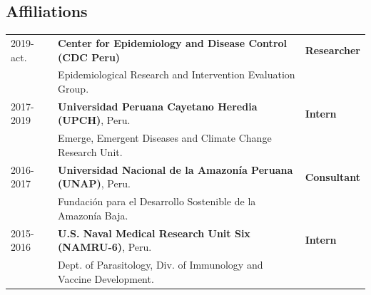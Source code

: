 \documentclass[margin,line]{res}
\begin{document}
\begin{resume}
\section{\sc Affiliations}

\begin{tabular}{ l l l }
	2019- act. & \textbf{Center for Epidemiology and Disease Control (CDC Peru)}&{\bf Researcher}\\
	& Epidemiological Research and Intervention Evaluation Group.&\\
	2017-2019 & \textbf{Universidad Peruana Cayetano Heredia (UPCH)}, Peru.&{\bf Intern}\\
	& Emerge, Emergent Diseases and Climate Change Research Unit.&\\
	2016-2017 & \textbf{Universidad Nacional de la Amazon\'ia Peruana (UNAP)}, Peru.&{\bf Consultant}\\
	& Fundaci\'on para el Desarrollo Sostenible de la Amazon\'ia Baja.&\\
	2015-2016 & \textbf{U.S. Naval Medical Research Unit Six (NAMRU-6)}, Peru.&{\bf Intern}\\
	& Dept. of Parasitology, Div. of Immunology and Vaccine Development.&\\
\end{tabular}\\



\end{resume}
\end{document}
